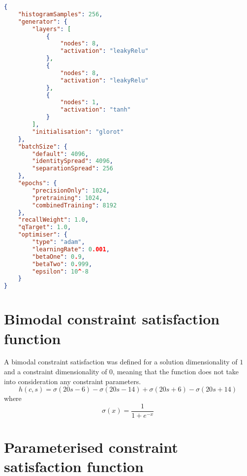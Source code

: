 \documentclass[../main.tex]{subfiles}
\begin{document}
\begin{lstlisting}[language=json,firstnumber=1,caption={Experimental parameters for training a generator to match an arbitrary constraint satisfaction function with no constraint inputs.},captionpos=b]
{
    "histogramSamples": 256,
    "generator": {
        "layers": [
            {
                "nodes": 8,
                "activation": "leakyRelu"
            },
            {
                "nodes": 8,
                "activation": "leakyRelu"
            },
            {
                "nodes": 1,
                "activation": "tanh"
            }
        ],
        "initialisation": "glorot"
    },
    "batchSize": {
        "default": 4096,
        "identitySpread": 4096,
        "separationSpread": 256
    },
    "epochs": {
        "precisionOnly": 1024,
        "pretraining": 1024,
        "combinedTraining": 8192
    },
    "recallWeight": 1.0,
    "qTarget": 1.0,
    "optimiser": {
        "type": "adam",
        "learningRate": 0.001,
        "betaOne": 0.9,
        "betaTwo": 0.999,
        "epsilon": 10^-8
    }
}
\end{lstlisting}

\section{Bimodal constraint satisfaction function} \label{appendix:bimodalCSF}

A bimodal constraint satisfaction was defined for a solution dimensionality of $1$ and a constraint dimensionality of $0$, meaning that the function does not take into consideration any constraint parameters.
\begin{equation}
    h(c,s)=\sigma(20s-6)-\sigma(20s-14)+\sigma(20s+6)-\sigma(20s+14)
\end{equation}
where
\begin{equation}
    \sigma(x)=\frac{1}{1+e^{-x}}
\end{equation}

\section{Parameterised constraint satisfaction function} \label{appendix:tensorflowCSF}
\end{document}
